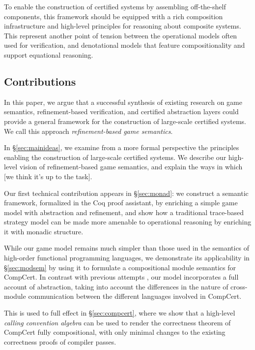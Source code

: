 \documentclass[acmsmall,timestamp,review]{acmart}
\begin{document}
To enable the construction of certified systems
by assembling off-the-shelf components,
this framework should be equipped with
a rich composition infrastructure
and high-level principles for
reasoning about composite systems.
This represent another point of tension
between the operational models
often used for verification,
and denotational models
that feature compositionality and
support equational reasoning.


\subsection{Contributions} %

In this paper,
we argue that
a successful synthesis of existing research
on game semantics,
refinement-based verification,
and certified abstraction layers
could provide a general framework
for the construction of large-scale certified systems.
We call this approach \emph{refinement-based game semantics}.

In \S\ref{sec:mainideas},
we examine from a more formal perspective
the principles enabling the construction
of large-scale certified systems.
We describe our high-level vision of
refinement-based game semantics,
and explain the ways in which
[we think it's up to the task].

Our first technical contribution
appears in \S\ref{sec:monad}:
we construct a semantic framework, formalized in the Coq proof assistant,
by enriching a simple game model
with abstraction and refinement,
and show how a traditional
trace-based strategy model
can be made more amenable to operational reasoning
by enriching it with monadic structure.

While our game model remains much simpler than
those used in the semantics of high-order
functional programming languages,
we demonstrate its applicability in \S\ref{sec:modsem}
by using it to formulate a compositional module semantics
for CompCert.
In contrast with previous attempts \cite{compcompcert,cpp15},
our model incorporates a full account of abstraction,
taking into account the differences in
the nature of cross-module communication
between the different languages involved in CompCert.

This is used to full effect in \S\ref{sec:compcert},
where we show that a high-level
\emph{calling convention algebra}
can be used to render the correctness theorem of CompCert
fully compositional,
with only minimal changes to the existing correctness proofs
of compiler passes.
\end{document}
